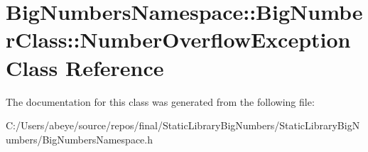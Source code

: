 \hypertarget{class_big_numbers_namespace_1_1_big_number_class_1_1_number_overflow_exception}{}\section{Big\+Numbers\+Namespace\+:\+:Big\+Number\+Class\+:\+:Number\+Overflow\+Exception Class Reference}
\label{class_big_numbers_namespace_1_1_big_number_class_1_1_number_overflow_exception}


The documentation for this class was generated from the following file\+:\begin{DoxyCompactItemize}
\item 
C\+:/\+Users/abeye/source/repos/final/\+Static\+Library\+Big\+Numbers/\+Static\+Library\+Big\+Numbers/Big\+Numbers\+Namespace.\+h\end{DoxyCompactItemize}
